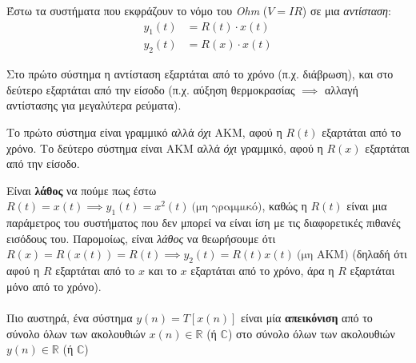 \documentclass[11pt,a4paper,notitlepage,fleqn]{article}
\begin{document}
Έστω τα συστήματα που εκφράζουν το νόμο του \emph{Ohm} (\( V=IR \)) σε μια \emph{αντίσταση}:
\begin{align*}
	y_1(t) &= R(t) \cdot x(t)\\
	y_2(t) &= R(x) \cdot x(t)
\end{align*}

Στο πρώτο σύστημα η αντίσταση εξαρτάται από το χρόνο (π.χ. διάβρωση), και στο δεύτερο εξαρτάται από την είσοδο (π.χ. αύξηση θερμοκρασίας \( \implies \) αλλαγή αντίστασης για μεγαλύτερα ρεύματα).

Το πρώτο σύστημα είναι γραμμικό αλλά \emph{όχι} ΑΚΜ, αφού η \( R(t) \) εξαρτάται από το χρόνο.
Το δεύτερο σύστημα είναι ΑΚΜ αλλά \emph{όχι} γραμμικό, αφού η \( R(x) \) εξαρτάται από την είσοδο.

Είναι \textbf{λάθος} να πούμε πως έστω \( R(t)=x(t) \implies y_1(t)=x^2(t)\ \text{(μη γραμμικό)} \), καθώς
η \( R(t) \) είναι μια παράμετρος του συστήματος που δεν μπορεί να είναι ίση με τις διαφορετικές πιθανές
εισόδους του. Παρομοίως, είναι \emph{λάθος} να θεωρήσουμε ότι \( R(x) = R(x(t)) = R(t) \implies y_2(t) = R(t)x(t) \ \text{(μη ΑΚΜ)} \) (δηλαδή ότι αφού η \( R \) εξαρτάται από το \( x \) και το \( x \) εξαρτάται από το χρόνο, άρα η \( R \) εξαρτάται μόνο από το χρόνο).


\paragraph{}
Πιο αυστηρά, ένα σύστημα \( y(n) = T\left[x(n)\right] \) είναι μία \textbf{απεικόνιση}
από το σύνολο όλων των ακολουθιών \( x(n) \in \mathbb R \) (ή \( \mathbb C \))
στο σύνολο όλων των ακολουθιών \( y(n) \in \mathbb R  \) (ή \( \mathbb{C} \))

\begin{center}
\end{center}
\end{document}
